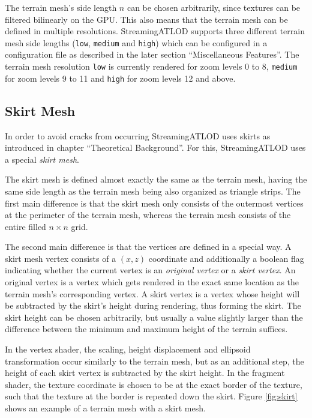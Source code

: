 The terrain mesh's side length $n$ can be chosen arbitrarily, since textures can be filtered bilinearly on the GPU.
This also means that the terrain mesh can be defined in multiple resolutions.
StreamingATLOD supports three different terrain mesh side lengths (\texttt{low}, \texttt{medium} and \texttt{high}) 
which can be configured in a configuration file
as described in the later section ``Miscellaneous Features''.
The terrain mesh resolution \texttt{low} is currently rendered for zoom levels 0 to 8,
\texttt{medium} for zoom levels 9 to 11 and \texttt{high} for zoom levels 12 and above.

\subsection{Skirt Mesh}
In order to avoid cracks from occurring StreamingATLOD 
uses skirts as introduced in chapter ``Theoretical Background''.
For this, StreamingATLOD uses a special \textit{skirt mesh}.

The skirt mesh is defined almost exactly the same as the terrain mesh,
having the same side length as the terrain mesh being also organized as triangle strips.
The first main difference is that the skirt mesh only consists of the outermost vertices at the perimeter of the terrain mesh,
whereas the terrain mesh consists of the entire filled  $n \times n$ grid.

The second main difference is that the vertices are defined in a special way.
A skirt mesh vertex consists of a $(x,z)$ coordinate
and additionally a boolean flag indicating whether the current vertex is an \textit{original vertex} or a \textit{skirt vertex}.
An original vertex is a vertex which gets rendered 
in the exact same location as the terrain mesh's corresponding vertex.
A skirt vertex is a vertex whose height will be subtracted by the skirt's height during rendering,
thus forming the skirt.
The skirt height can be chosen arbitrarily, but usually a value slightly larger than the difference between the minimum and maximum
height of the terrain suffices.

In the vertex shader, the scaling, height displacement and ellipsoid transformation occur similarly to the terrain mesh,
but as an additional step, the height of each skirt vertex is subtracted by the skirt height.
In the fragment shader, the texture coordinate is chosen to be at the exact border of the texture,
such that the texture at the border is repeated down the skirt. Figure \ref{fig:skirt} shows an example of a terrain mesh with a skirt mesh.

